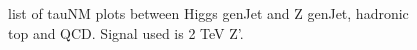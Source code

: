 \begin{figure}[h!tpb]
\begin{center}
\end{center}
\caption{
list of tauNM plots between Higgs genJet and Z genJet, hadronic top and QCD. 
Signal used is 2 TeV Z'. 
}
\label{fig:tauNM2}
\end{figure}




\clearpage

